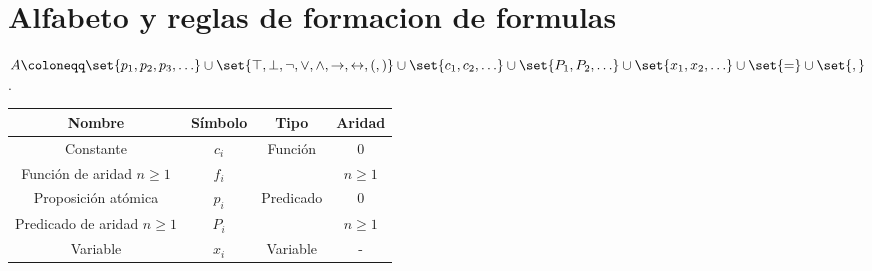\section{Alfabeto y reglas de formacion de formulas}
\begin{definition}
	\(A \coloneqq \set{p_1,p_2,p_3,\ldots} \cup \set{\top, \perp, \neg, \vee ,\wedge ,\rightarrow, \leftrightarrow, (,)} \cup \set{c_1,c_2,\ldots} \cup \set{P_1,P_2, \ldots} \cup \set{x_1,x_2,\ldots} \cup \set{=} \cup \set{,}\).
\end{definition}

\begin{table}[H]
	\centering
	\begin{tabular}{|c|c|c|c|}
		\hline
		\textbf{Nombre}                  & \textbf{Símbolo} & \textbf{Tipo}              & \textbf{Aridad} \\ \hline
		Constante                        & \(c_i\)          & \multirow{2}{*}{Función}   & 0               \\ \cline{1-2} \cline{4-4}
		Función de aridad \(n \geq 1\)   & \(f_i\)          &                            & \(n \geq 1\)    \\ \hline
		Proposición atómica              & \(p_i\)          & \multirow{2}{*}{Predicado} & 0               \\ \cline{1-2} \cline{4-4}
		Predicado de aridad \(n \geq 1\) & \(P_i\)          &                            & \(n \geq 1\)    \\ \hline
		Variable                         & \(x_i\)          & Variable                   & -               \\ \hline
	\end{tabular}
\end{table}

